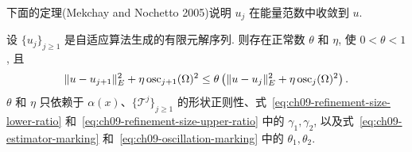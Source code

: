 下面的定理(Mekchay and Nochetto 2005)说明 $u_j$ 在能量范数中收敛到 $u$.

\begin{Theorem}
\label{thm:ch09-adaptive-contraction}
设 $\{u_j\}_{j\geq1}$ 是自适应算法生成的有限元解序列. 则存在正常数 $\theta$ 和 $\eta$, 使 $0<\theta<1$, 且
\begin{equation}
\MathBookFormulaID{formula-ch09-adaptive-contraction}
\label{eq:ch09-adaptive-contraction}
\|u-u_{j+1}\|_E^2+\eta\operatorname{osc}_{j+1}(\Omega)^2
\leq\theta\left(\|u-u_j\|_E^2+\eta\operatorname{osc}_j(\Omega)^2\right).
\end{equation}
$\theta$ 和 $\eta$ 只依赖于 $\alpha(x)$、$\{\mathcal T^j\}_{j\geq1}$ 的形状正则性、式~\eqref{eq:ch09-refinement-size-lower-ratio} 和~\eqref{eq:ch09-refinement-size-upper-ratio} 中的 $\gamma_1,\gamma_2$, 以及式~\eqref{eq:ch09-estimator-marking} 和~\eqref{eq:ch09-oscillation-marking} 中的 $\theta_1,\theta_2$.
\end{Theorem}

